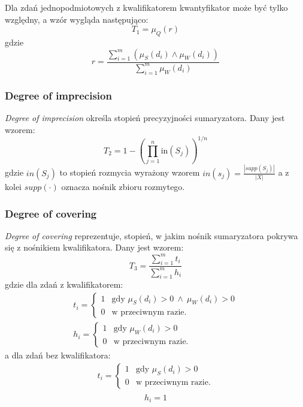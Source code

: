 \documentclass{classrep}
\begin{document}
Dla zdań jednopodmiotowych z kwalifikatorem kwantyfikator może być tylko względny, a wzór wygląda następująco:
\begin{equation}
T_1 = \mu_Q(r)
\end{equation}
gdzie 
\begin{equation}
r = \frac{\sum_{i=1}^{m} (\mu_{S} (d_i) \land \mu_{W} (d_i))}{\sum_{i=1}^{m} \mu_{W} (d_i)}
\end{equation}

	\subsubsection{Degree of imprecision}
\textsl{Degree of imprecision} określa stopień precyzyjności sumaryzatora. Dany jest wzorem:
	\begin{equation}
T_2 = 1 - \left(\prod_{j=1}^{n} \mathrm{in}(S_j)\right)^{1/n}
	\end{equation}
gdzie $in(S_j)$ to stopień rozmycia wyrażony wzorem
$
in(s_j) = \frac{|supp(S_j)|}{|X|}
$
a z kolei $supp(\cdot)$ oznacza nośnik zbioru rozmytego.


	\subsubsection{Degree of covering}
\textsl{Degree of covering} reprezentuje, stopień, w jakim nośnik sumaryzatora pokrywa się z nośnikiem kwalifikatora. Dany jest wzorem:
	\begin{equation}
T_3 = \frac{\sum_{i=1}^{m}t_i}{\sum_{i=1}^{m}h_i}
	\end{equation}
gdzie dla zdań z kwalifikatorem:
\[
\begin{array}{l}
t_i = \begin{cases}
1 & \mbox{gdy } \mu_{S}(d_i) > 0 ~ \wedge ~ \mu_{W}(d_i) > 0 \\
0 & \mbox{w przeciwnym razie.}
\end{cases} \\
h_i = \begin{cases}
1 & \mbox{gdy } \mu_{W}(d_i) > 0 \\
0 & \mbox{w przeciwnym razie.}
\end{cases}
\end{array}\]
a dla zdań bez kwalifikatora:
\[
\begin{array}{l}
t_i = \begin{cases}
1 & \mbox{gdy } \mu_{S}(d_i) > 0  \\
0 & \mbox{w przeciwnym razie.}
\end{cases} \\
\end{array}\]
\[h_i = 1\]
\end{document}
